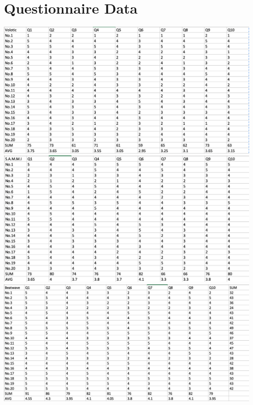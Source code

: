 \chapter{Questionnaire Data}
\label{app: Appendix D}

\includegraphics[width=\textwidth]{images/questionnaire_data1.png}
\includegraphics[width=\textwidth]{images/questionnaire_data2.png}
\includegraphics[width=\textwidth]{images/questionnaire_data3.png}

\clearpage
